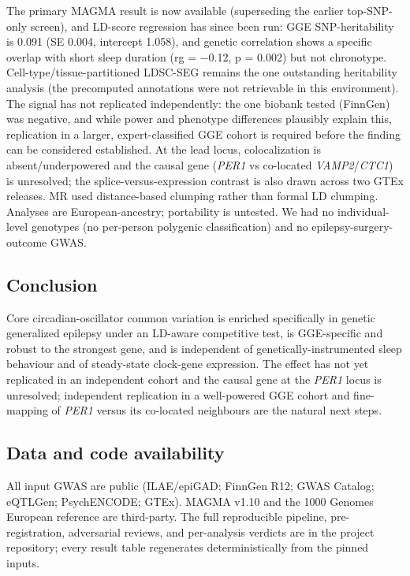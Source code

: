 \documentclass[
]{article}
\begin{document}
The primary MAGMA result is now available (superseding the earlier
top-SNP-only screen), and LD-score regression has since been run: GGE
SNP-heritability is 0.091 (SE 0.004, intercept 1.058), and genetic
correlation shows a specific overlap with short sleep duration (rg =
−0.12, p = 0.002) but not chronotype. Cell-type/tissue-partitioned
LDSC-SEG remains the one outstanding heritability analysis (the
precomputed annotations were not retrievable in this environment). The
signal has not replicated independently: the one biobank tested
(FinnGen) was negative, and while power and phenotype differences
plausibly explain this, replication in a larger, expert-classified GGE
cohort is required before the finding can be considered established. At
the lead locus, colocalization is absent/underpowered and the causal
gene (\emph{PER1} vs co-located \emph{VAMP2}/\emph{CTC1}) is unresolved;
the splice-versus-expression contrast is also drawn across two GTEx
releases. MR used distance-based clumping rather than formal LD
clumping. Analyses are European-ancestry; portability is untested. We
had no individual-level genotypes (no per-person polygenic
classification) and no epilepsy-surgery-outcome GWAS.

\subsection{Conclusion}\label{conclusion}

Core circadian-oscillator common variation is enriched specifically in
genetic generalized epilepsy under an LD-aware competitive test, is
GGE-specific and robust to the strongest gene, and is independent of
genetically-instrumented sleep behaviour and of steady-state clock-gene
expression. The effect has not yet replicated in an independent cohort
and the causal gene at the \emph{PER1} locus is unresolved; independent
replication in a well-powered GGE cohort and fine-mapping of \emph{PER1}
versus its co-located neighbours are the natural next steps.

\subsection{Data and code
availability}\label{data-and-code-availability}

All input GWAS are public (ILAE/epiGAD; FinnGen R12; GWAS Catalog;
eQTLGen; PsychENCODE; GTEx). MAGMA v1.10 and the 1000 Genomes European
reference are third-party. The full reproducible pipeline,
pre-registration, adversarial reviews, and per-analysis verdicts are in
the project repository; every result table regenerates deterministically
from the pinned inputs.
\end{document}

